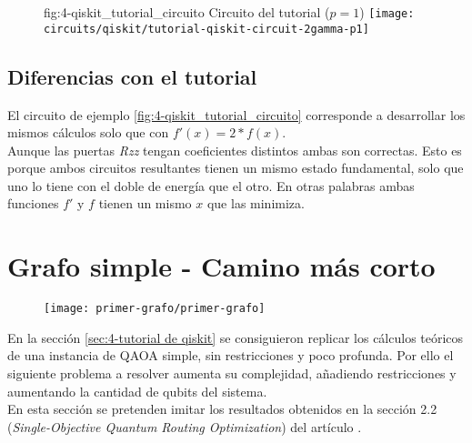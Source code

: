 \begin{figure}[htbp]{fig:4-qiskit_tutorial_circuito}{ Circuito del tutorial ($p=1$) }
  \centering
  \texttt{[image: circuits/qiskit/tutorial-qiskit-circuit-2gamma-p1]}
\end{figure}

\subsection{Diferencias con el tutorial}

El circuito de ejemplo \ref{fig:4-qiskit_tutorial_circuito} corresponde a desarrollar los mismos cálculos solo que con $f'(x) = 2*f(x)$. \\
Aunque las puertas \textit{Rzz} tengan coeficientes distintos ambas son correctas. Esto es porque ambos circuitos resultantes tienen un mismo estado fundamental, solo que uno lo tiene con el doble de energía que el otro. En otras palabras ambas funciones $f'$ y $f$ tienen un mismo $x$ que las minimiza.

\section{Grafo simple - Camino más corto}
\label{sec:4-primer grafo}

\begin{figure}[htbp]{}{}
  \centering
  \texttt{[image: primer-grafo/primer-grafo]}
\end{figure}

En la sección \ref{sec:4-tutorial de qiskit} se consiguieron replicar los cálculos teóricos de una instancia de QAOA simple, sin restricciones y poco profunda. Por ello el siguiente problema a resolver aumenta su complejidad, añadiendo restricciones y aumentando la cantidad de qubits del sistema. \\
En esta sección se pretenden imitar los resultados obtenidos en la sección 2.2 (\textit{Single-Objective Quantum Routing Optimization}) del artículo \cite{multi-objective_routing_optimization}.



